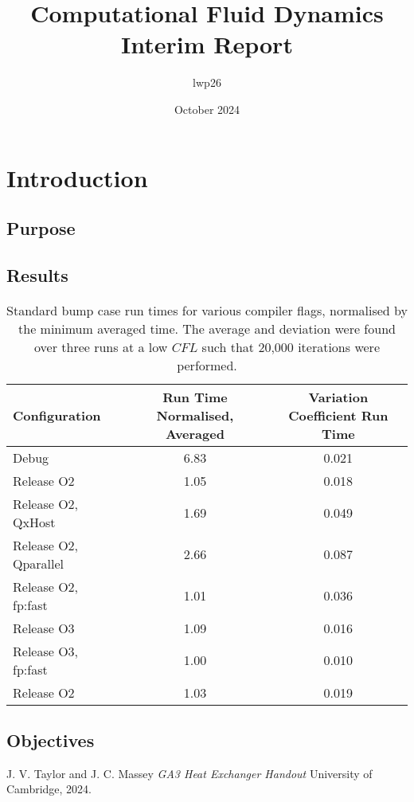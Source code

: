 \documentclass{article}
\begin{document}
\title{Computational Fluid Dynamics \\
    \large Interim Report}
\author{lwp26}
\date{October 2024}
\maketitle 

\iffalse
\begin{abstract}
    \centering

\end{abstract}
\fi

\section{Introduction}

\subsection{Purpose}


\subsection{Results}

\begin{table}[h!]
    \centering
    \begin{tabular}{lcc}
        \toprule
        \textbf{Configuration} & \textbf{Run Time Normalised, Averaged } & \textbf{Variation Coefficient Run Time} \\
        \midrule
        Debug & 6.83 & 0.021 \\
        Release O2 & 1.05 & 0.018 \\
        Release O2, QxHost & 1.69 & 0.049 \\
        Release O2, Qparallel & 2.66 & 0.087 \\
        Release O2, fp:fast & 1.01 & 0.036 \\
        Release O3 & 1.09 & 0.016 \\
        Release O3, fp:fast & 1.00 & 0.010 \\
        Release O2 & 1.03 & 0.019 \\
        \bottomrule
    \end{tabular}
    \caption{Standard bump case run times for various compiler flags, normalised by the minimum averaged time. The average and deviation were found over three runs at a low $CFL$ such that 20,000 iterations were performed.}
    \label{tab:performance}
\end{table}


\subsection{Objectives}


\begin{thebibliography}{9}

  J. V. Taylor and J. C. Massey
  \emph{GA3 Heat Exchanger Handout}
  University of Cambridge,
  2024.

\end{thebibliography}
\end{document}
